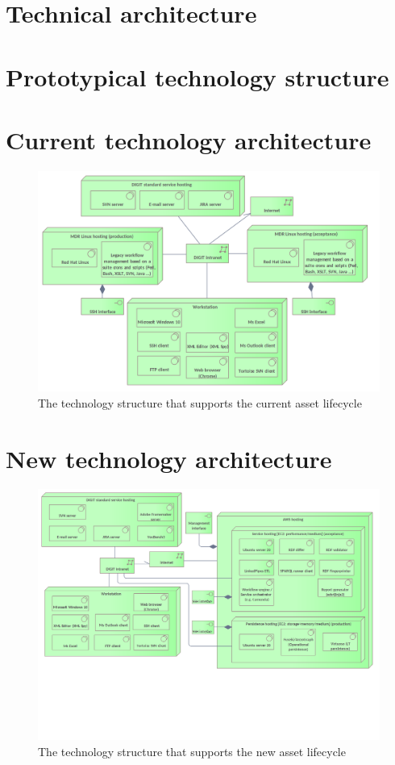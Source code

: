 \section{Technical architecture}
\label{sec:technical-architecture}

	\section{Prototypical technology structure}
	
	
	\section{Current technology architecture}
	\label{sec:technology-current}
	
	
	\begin{figure}[h]
		\centering
		\includegraphics[width=1.01\textwidth]{images/technology/Current Platform.png}
		\caption{The technology structure that supports the current asset lifecycle}
		\label{fig:technology-current}
	\end{figure}
	
	\section{New technology architecture}
	\label{sec:technology-new}	
	
	\begin{figure}[h]
		\centering
		\includegraphics[width=1.01\textwidth]{images/technology/New Platform.png}
		\caption{The technology structure that supports the new asset lifecycle}
		\label{fig:technology-new}
	\end{figure}